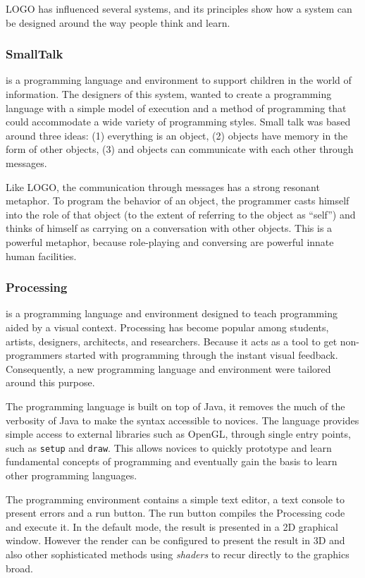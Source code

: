 LOGO has influenced several systems, and its principles show how a system can be designed around the way people think and learn.
\subsubsection{SmallTalk~\cite{Kay1993}} is a programming language and environment to support children in the world of information. The designers of this system, wanted to create a programming language with a simple model of execution and a method of programming that could accommodate a wide variety of programming styles. Small talk was based around three ideas: (1) everything is an object, (2) objects have memory in the form of other objects, (3) and objects can communicate with each other through messages.

Like LOGO, the communication through messages has a strong resonant metaphor. To program the behavior of an object, the programmer casts himself into the role of that object (to the extent of referring to the object as ``self'') and thinks of himself as carrying on a conversation with other objects. This is a powerful metaphor, because role-playing and conversing are powerful innate human facilities. 
\subsubsection{Processing~\cite{Reas2006}} is a programming language and environment designed to teach programming aided by a visual context. Processing has become popular among students, artists, designers, architects, and researchers. Because it acts as a tool to get non-programmers started with programming through the instant visual feedback. Consequently, a new programming language and environment were tailored around this purpose.

The programming language is built on top of Java, it removes the much of the verbosity of Java to make the syntax accessible to novices. The language provides simple access to external libraries such as OpenGL, through single entry points, such as \texttt{setup} and \texttt{draw}. This allows novices to quickly prototype and learn fundamental concepts of programming and eventually gain the basis to learn other programming languages.

The programming environment contains a simple text editor, a text console to present errors and a run button. The run button compiles the Processing code and execute it. In the default mode, the result is presented in a 2D graphical window. However the render can be configured to present the result in 3D and also other sophisticated methods using \textit{shaders} to recur directly to the graphics broad. 

